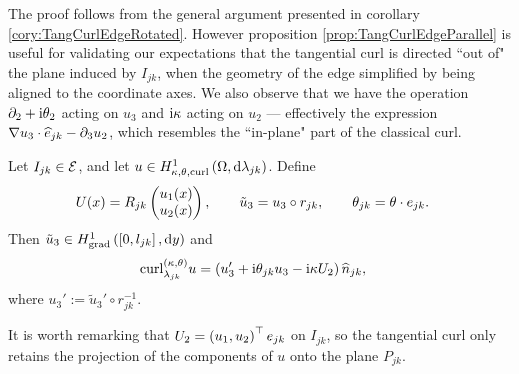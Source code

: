 The proof follows from the general argument presented in corollary \ref{cory:TangCurlEdgeRotated}.
However proposition \ref{prop:TangCurlEdgeParallel} is useful for validating our expectations that the tangential curl is directed ``out of" the plane induced by $I_{jk}$, when the geometry of the edge simplified by being aligned to the coordinate axes.
We also observe that we have the operation $\partial_2+\mathrm{i}\theta_2$ acting on $u_3$ and $\mathrm{i}\kappa$ acting on $u_2$ --- effectively the expression $\nabla u_3\cdot\widehat{e}_{jk} - \partial_3 u_2$, which resembles the ``in-plane" part of the classical curl.
\begin{cory} \label{cory:TangCurlEdgeRotated}
	Let $I_{jk}\in\mathcal{E}$, and let $u\in H^1_{\kappa,\theta,\mathrm{curl}}\left( \Omega, \mathrm{d}\lambda_{jk} \right)$.
	Define
	\begin{align*}
		U(x) = R_{jk}\begin{pmatrix} u_1(x) \\ u_2(x) \end{pmatrix},
		\qquad
		\tilde{u}_3 &= u_3\circ r_{jk}, 
		\qquad
		\theta_{jk} = \theta\cdot e_{jk}.
	\end{align*}
	Then $\tilde{u}_3\in H^1_\mathrm{grad}\left( \left[ 0,l_{jk} \right], \mathrm{d}y \right)$ and
	\begin{align*}
		\mathrm{curl}_{\lambda_{jk}}^{\left( \kappa, \theta \right)}u &= \left(  u_3' + \mathrm{i}\theta_{jk}u_3 - \mathrm{i}\kappa U_2  \right)\widehat{n}_{jk},
	\end{align*}
	where $u_3' := \tilde{u}_3'\circ r_{jk}^{-1}$.
\end{cory}
It is worth remarking that $U_2 = \left( u_1,u_2 \right)^{\top}e_{jk}$ on $I_{jk}$, so the tangential curl only retains the projection of the components of $u$ onto the plane $P_{jk}$.
